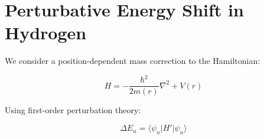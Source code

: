 \documentclass{article}
\begin{document}
\section*{Perturbative Energy Shift in Hydrogen}

We consider a position-dependent mass correction to the Hamiltonian:


\[
H = -\frac{\hbar^2}{2m(r)}\nabla^2 + V(r)
\]



Using first-order perturbation theory:


\[
\Delta E_n = \langle \psi_n | H' | \psi_n \rangle
\]
\end{document}
